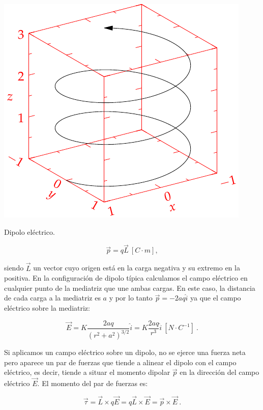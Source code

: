 \documentclass{tufte-handout}
\begin{document}
\begin{marginfigure}%
    \includegraphics[width=\linewidth]{helix}
    \caption{Dipolo eléctrico.}
    \label{fig:dipolo}
\end{marginfigure}

\begin{equation}
\vec{p} = q\vec{L}~[C\cdot m],
\end{equation}

siendo $\vec{L}$ un vector cuyo origen está en la carga negativa y su extremo en la positiva. En la configuración de dipolo típica calculamos el campo eléctrico en cualquier punto de la mediatriz que une ambas cargas. En este caso, la distancia de cada carga a la mediatriz es $a$ y por lo tanto $\vec{p} = -2aq\hat{i}$ ya que el campo eléctrico sobre la mediatriz:

\begin{equation}
\vec{E} = K\frac{2aq}{(r^2 + a^2)^{3/2}}\hat{i} = K\frac{2aq}{r^3}\hat{i}~[N\cdot C^{-1}]~.
\end{equation}

Si aplicamos un campo eléctrico sobre un dipolo, no se ejerce una fuerza neta pero aparece un par de fuerzas que tiende a alinear el dipolo con el campo eléctrico, es decir, tiende a situar el momento dipolar $\vec{p}$ en la dirección del campo eléctrico $\vec{E}$. El momento del par de fuerzas es:

\begin{equation}
\vec{\tau} = \vec{L} \times q\vec{E} = q\vec{L} \times \vec{E} = \vec{p} \times \vec{E}~.
\end{equation}
\end{document}
